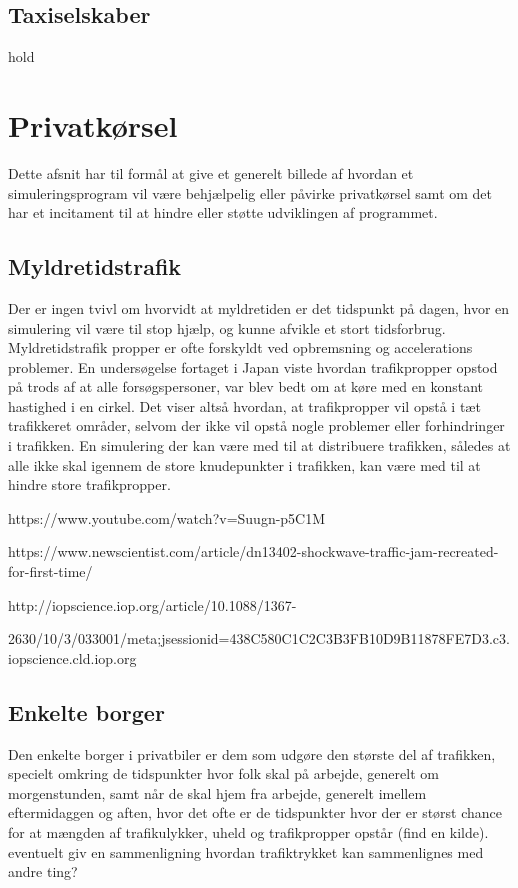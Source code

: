 \subsection{Taxiselskaber}\label{Taxiselskaber}

hold

\section{Privatkørsel}\label{Privatkoersel}

Dette afsnit har til formål at give et generelt billede af hvordan et simuleringsprogram vil være behjælpelig eller påvirke privatkørsel samt om det har et incitament til at hindre eller støtte udviklingen af programmet.

\subsection{Myldretidstrafik}\label{Myldretidstrafik}

Der er ingen tvivl om hvorvidt at myldretiden er det tidspunkt på dagen, hvor en simulering vil være til stop hjælp, og kunne afvikle et stort tidsforbrug. Myldretidstrafik propper er ofte forskyldt ved opbremsning og accelerations problemer. En undersøgelse fortaget i Japan viste  hvordan trafikpropper opstod på trods af at alle forsøgspersoner, var blev bedt om at køre med en konstant hastighed i en cirkel. Det viser altså hvordan, at trafikpropper vil opstå i tæt trafikkeret områder, selvom der ikke vil opstå nogle problemer eller forhindringer i trafikken. En simulering der kan være med til at distribuere trafikken, således at alle ikke skal igennem de store knudepunkter i trafikken, kan være med til at hindre store trafikpropper.

https://www.youtube.com/watch?v=Suugn-p5C1M

https://www.newscientist.com/article/dn13402-shockwave-traffic-jam-recreated-for-first-time/

http://iopscience.iop.org/article/10.1088/1367-

2630/10/3/033001/meta;jsessionid=438C580C1C2C3B3FB10D9B11878FE7D3.c3.iopscience.cld.iop.org

\subsection{Enkelte borger}\label{Enkelte-borger}

Den enkelte borger i privatbiler er dem som udgøre den største del af trafikken, specielt omkring de tidspunkter hvor folk skal på arbejde, generelt om morgenstunden, samt når de skal hjem fra arbejde, generelt imellem eftermidaggen og aften, hvor det ofte er de tidspunkter hvor der er størst chance for at mængden af trafikulykker, uheld og trafikpropper opstår (find en kilde). eventuelt giv en sammenligning hvordan trafiktrykket kan sammenlignes med andre ting?

